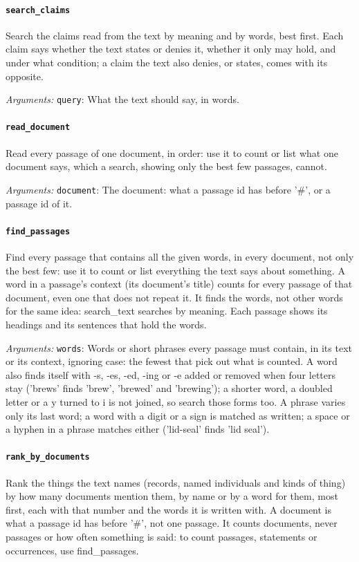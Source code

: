 \paragraph{\texttt{search\_claims}} Search the claims read from the text by meaning and by words, best first. Each claim says whether the text states or denies it, whether it only may hold, and under what condition; a claim the text also denies, or states, comes with its opposite.

\noindent\emph{Arguments:} \texttt{query}: What the text should say, in words.

\paragraph{\texttt{read\_document}} Read every passage of one document, in order: use it to count or list what one document says, which a search, showing only the best few passages, cannot.

\noindent\emph{Arguments:} \texttt{document}: The document: what a passage id has before '\#', or a passage id of it.

\paragraph{\texttt{find\_passages}} Find every passage that contains all the given words, in every document, not only the best few: use it to count or list everything the text says about something. A word in a passage's context (its document's title) counts for every passage of that document, even one that does not repeat it. It finds the words, not other words for the same idea: search\_text searches by meaning. Each passage shows its headings and its sentences that hold the words.

\noindent\emph{Arguments:} \texttt{words}: Words or short phrases every passage must contain, in its text or its context, ignoring case: the fewest that pick out what is counted. A word also finds itself with -s, -es, -ed, -ing or -e added or removed when four letters stay ('brews' finds 'brew', 'brewed' and 'brewing'); a shorter word, a doubled letter or a y turned to i is not joined, so search those forms too. A phrase varies only its last word; a word with a digit or a sign is matched as written; a space or a hyphen in a phrase matches either ('lid-seal' finds 'lid seal').

\paragraph{\texttt{rank\_by\_documents}} Rank the things the text names (records, named individuals and kinds of thing) by how many documents mention them, by name or by a word for them, most first, each with that number and the words it is written with. A document is what a passage id has before '\#', not one passage. It counts documents, never passages or how often something is said: to count passages, statements or occurrences, use find\_passages.

